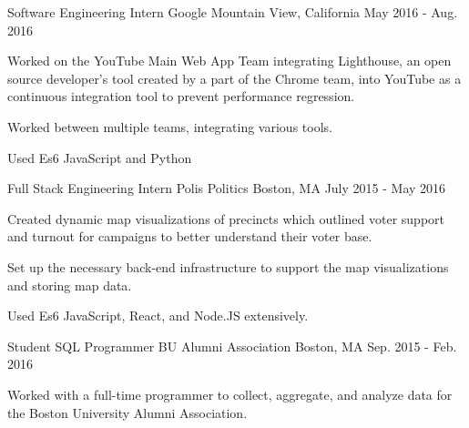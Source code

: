 


\begin{cventries}


\cventry
{Software Engineering Intern} %
{Google} %
{Mountain View, California} %
{May 2016 - Aug. 2016} %
{ %
\begin{cvitems}
\item {Worked on the YouTube Main Web App Team integrating Lighthouse, an open source developer's tool created by a part of the Chrome team, into YouTube as a continuous integration tool to prevent performance regression.}
\item {Worked between multiple teams, integrating various tools.}
\item {Used Es6 JavaScript and Python}
\end{cvitems}
}


\cventry
{Full Stack Engineering Intern} %
{Polis Politics} %
{Boston, MA} %
{July 2015 - May 2016} %
{ %
\begin{cvitems}
\item {Created dynamic map visualizations of precincts which outlined voter support and turnout for campaigns to better understand their voter base.}
\item {Set up the necessary back-end infrastructure to support the map visualizations and storing map data.}
\item {Used Es6 JavaScript, React, and Node.JS extensively.}
\end{cvitems}
}


\cventry
{Student SQL Programmer} %
{BU Alumni Association} %
{Boston, MA} %
{Sep. 2015 - Feb. 2016} %
{ %
\begin{cvitems}
\item {Worked with a full-time programmer to collect, aggregate, and analyze data for the Boston University Alumni Association.}
\end{cvitems}
}


\end{cventries}
